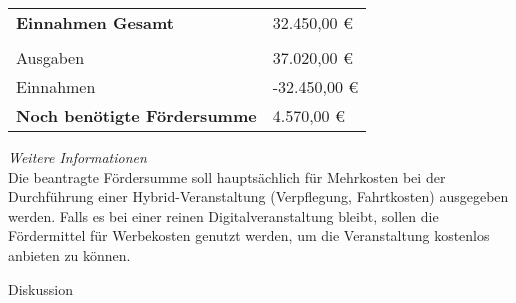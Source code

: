 {\begin{longtable}{p{12cm} p{3cm}}
        \textbf{Einnahmen Gesamt} & 32.450,00 €\\
        \\
        Ausgaben & 37.020,00 €\\
        Einnahmen & -32.450,00 €\\
        \textbf{Noch benötigte Fördersumme} & 4.570,00 €\\
    \end{longtable}
    \vspace*{2em}
    \emph{Weitere Informationen}\\
    Die beantragte Fördersumme soll hauptsächlich für Mehrkosten bei der Durchführung einer Hybrid-Veranstaltung (Verpflegung, Fahrtkosten) ausgegeben werden. Falls es bei einer reinen Digitalveranstaltung bleibt, sollen die Fördermittel für Werbekosten genutzt werden, um die Veranstaltung kostenlos anbieten zu können.
}{
    Diskussion
}
